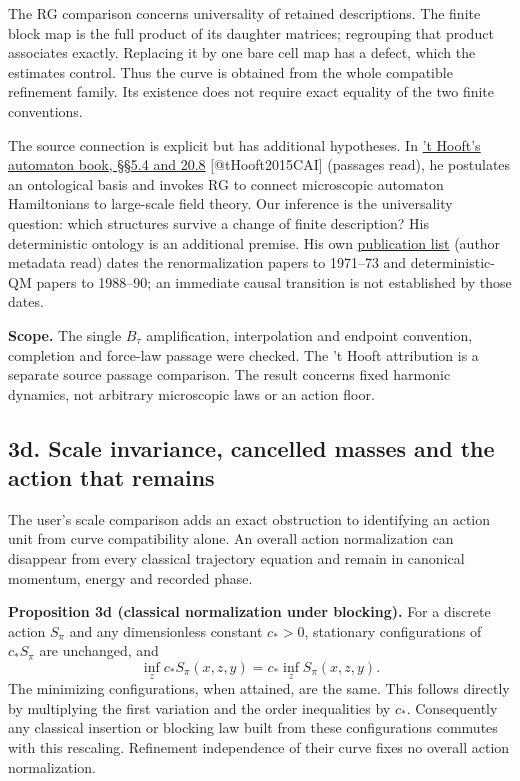 \documentclass[11pt,a4paper]{article}
\begin{document}
The RG comparison concerns universality of retained descriptions. The
finite block map is the full product of its daughter matrices;
regrouping that product associates exactly. Replacing it by one bare
cell map has a defect, which the estimates control. Thus the curve is
obtained from the whole compatible refinement family. Its existence does
not require exact equality of the two finite conventions.

The source connection is explicit but has additional hypotheses. In
\href{https://arxiv.org/pdf/1405.1548v3}{'t Hooft's automaton book,
§§5.4 and 20.8} {[}@tHooft2015CAI{]} (passages read), he postulates an
ontological basis and invokes RG to connect microscopic automaton
Hamiltonians to large-scale field theory. Our inference is the
universality question: which structures survive a change of finite
description? His deterministic ontology is an additional premise. His
own
\href{https://webspace.science.uu.nl/~hooft101/gthpub.html}{publication
list} (author metadata read) dates the renormalization papers to
1971--73 and deterministic-QM papers to 1988--90; an immediate causal
transition is not established by those dates.

\textbf{Scope.} The single \(B_\tau\) amplification, interpolation and
endpoint convention, completion and force-law passage were checked. The
't Hooft attribution is a separate source passage comparison. The result
concerns fixed harmonic dynamics, not arbitrary microscopic laws or an
action floor.

\hypertarget{d.-scale-invariance-cancelled-masses-and-the-action-that-remains}{%
\subsection{3d. Scale invariance, cancelled masses and the action that
remains}\label{d.-scale-invariance-cancelled-masses-and-the-action-that-remains}}

The user's scale comparison adds an exact obstruction to identifying an
action unit from curve compatibility alone. An overall action
normalization can disappear from every classical trajectory equation and
remain in canonical momentum, energy and recorded phase.

\textbf{Proposition 3d (classical normalization under blocking).} For a
discrete action \(S_\pi\) and any dimensionless constant \(c_*>0\),
stationary configurations of \(c_*S_\pi\) are unchanged, and
\[\inf_z c_*S_\pi(x,z,y)=c_*\inf_zS_\pi(x,z,y).\tag{6m}\] The minimizing
configurations, when attained, are the same. This follows directly by
multiplying the first variation and the order inequalities by \(c_*\).
Consequently any classical insertion or blocking law built from these
configurations commutes with this rescaling. Refinement independence of
their curve fixes no overall action normalization.
\end{document}
